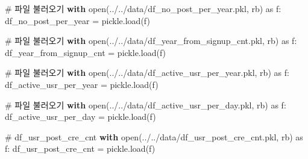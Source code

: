 \documentclass[
  letterpaper,
  DIV=11,
  numbers=noendperiod]{scrartcl}
\newenvironment{Shaded}{\begin{snugshade}}{\end{snugshade}}
\newcommand{\BuiltInTok}[1]{\textcolor[rgb]{0.00,0.23,0.31}{#1}}
\newcommand{\CommentTok}[1]{\textcolor[rgb]{0.37,0.37,0.37}{#1}}
\newcommand{\ControlFlowTok}[1]{\textcolor[rgb]{0.00,0.23,0.31}{\textbf{#1}}}
\newcommand{\ImportTok}[1]{\textcolor[rgb]{0.00,0.46,0.62}{#1}}
\newcommand{\NormalTok}[1]{\textcolor[rgb]{0.00,0.23,0.31}{#1}}
\newcommand{\OperatorTok}[1]{\textcolor[rgb]{0.37,0.37,0.37}{#1}}
\newcommand{\StringTok}[1]{\textcolor[rgb]{0.13,0.47,0.30}{#1}}
\begin{document}
\begin{Shaded}
\begin{Highlighting}[]
\CommentTok{\# 파일 불러오기}
\ControlFlowTok{with} \BuiltInTok{open}\NormalTok{(}\StringTok{\textquotesingle{}../../data/df\_no\_post\_per\_year.pkl\textquotesingle{}}\NormalTok{, }\StringTok{\textquotesingle{}rb\textquotesingle{}}\NormalTok{) }\ImportTok{as}\NormalTok{ f:}
\NormalTok{    df\_no\_post\_per\_year }\OperatorTok{=}\NormalTok{ pickle.load(f)}
\end{Highlighting}
\end{Shaded}

\begin{Shaded}
\begin{Highlighting}[]
\CommentTok{\# 파일 불러오기}
\ControlFlowTok{with} \BuiltInTok{open}\NormalTok{(}\StringTok{\textquotesingle{}../../data/df\_year\_from\_signup\_cnt.pkl\textquotesingle{}}\NormalTok{, }\StringTok{\textquotesingle{}rb\textquotesingle{}}\NormalTok{) }\ImportTok{as}\NormalTok{ f:}
\NormalTok{    df\_year\_from\_signup\_cnt }\OperatorTok{=}\NormalTok{ pickle.load(f)}
\end{Highlighting}
\end{Shaded}

\begin{Shaded}
\begin{Highlighting}[]
\CommentTok{\# 파일 불러오기}
\ControlFlowTok{with} \BuiltInTok{open}\NormalTok{(}\StringTok{\textquotesingle{}../../data/df\_active\_usr\_per\_year.pkl\textquotesingle{}}\NormalTok{, }\StringTok{\textquotesingle{}rb\textquotesingle{}}\NormalTok{) }\ImportTok{as}\NormalTok{ f:}
\NormalTok{    df\_active\_usr\_per\_year }\OperatorTok{=}\NormalTok{ pickle.load(f)}
\end{Highlighting}
\end{Shaded}

\begin{Shaded}
\begin{Highlighting}[]
\CommentTok{\# 파일 불러오기}
\ControlFlowTok{with} \BuiltInTok{open}\NormalTok{(}\StringTok{\textquotesingle{}../../data/df\_active\_usr\_per\_day.pkl\textquotesingle{}}\NormalTok{, }\StringTok{\textquotesingle{}rb\textquotesingle{}}\NormalTok{) }\ImportTok{as}\NormalTok{ f:}
\NormalTok{    df\_active\_usr\_per\_day }\OperatorTok{=}\NormalTok{ pickle.load(f)}

\end{Highlighting}
\end{Shaded}

\begin{Shaded}
\begin{Highlighting}[]
\CommentTok{\# df\_usr\_post\_cre\_cnt}
\ControlFlowTok{with} \BuiltInTok{open}\NormalTok{(}\StringTok{\textquotesingle{}../../data/df\_usr\_post\_cre\_cnt.pkl\textquotesingle{}}\NormalTok{, }\StringTok{\textquotesingle{}rb\textquotesingle{}}\NormalTok{) }\ImportTok{as}\NormalTok{ f:}
\NormalTok{    df\_usr\_post\_cre\_cnt }\OperatorTok{=}\NormalTok{ pickle.load(f)}
\end{Highlighting}
\end{Shaded}
\end{document}
